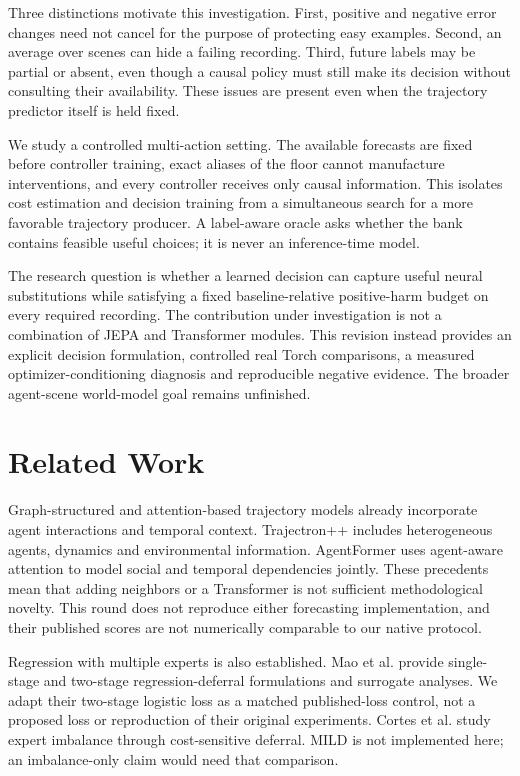 \documentclass[10pt,twocolumn,letterpaper]{article}
\begin{document}
Three distinctions motivate this investigation. First, positive and negative
error changes need not cancel for the purpose of protecting easy examples.
Second, an average over scenes can hide a failing recording. Third, future
labels may be partial or absent, even though a causal policy must still make
its decision without consulting their availability. These issues are present
even when the trajectory predictor itself is held fixed.

We study a controlled multi-action setting. The available forecasts are fixed
before controller training, exact aliases of the floor cannot manufacture
interventions, and every controller receives only causal information. This
isolates cost estimation and decision training from a simultaneous search for
a more favorable trajectory producer. A label-aware oracle asks whether the
bank contains feasible useful choices; it is never an inference-time model.

The research question is whether a learned decision can capture useful neural
substitutions while satisfying a fixed baseline-relative positive-harm budget
on every required recording. The contribution under investigation is not a
combination of JEPA and Transformer modules. This revision instead provides
an explicit decision formulation, controlled real Torch comparisons, a
measured optimizer-conditioning diagnosis and reproducible negative evidence.
The broader agent-scene world-model goal remains unfinished.

\section{Related Work}
Graph-structured and attention-based trajectory models already incorporate
agent interactions and temporal context. Trajectron++ \cite{ref1} includes heterogeneous
agents, dynamics and environmental information. AgentFormer \cite{ref2} uses agent-aware
attention to model social and temporal dependencies jointly. These precedents
mean that adding neighbors or a Transformer is not sufficient methodological
novelty. This round does not reproduce either forecasting implementation, and
their published scores are not numerically comparable to our native protocol.

Regression with multiple experts is also established. Mao et al. \cite{ref3} provide
single-stage and two-stage regression-deferral formulations and surrogate
analyses. We adapt their two-stage logistic loss as a matched published-loss
control, not a proposed loss or reproduction of their original experiments.
Cortes et al. \cite{ref4} study expert imbalance through cost-sensitive deferral. MILD
is not implemented here; an imbalance-only claim would need that comparison.
\end{document}
